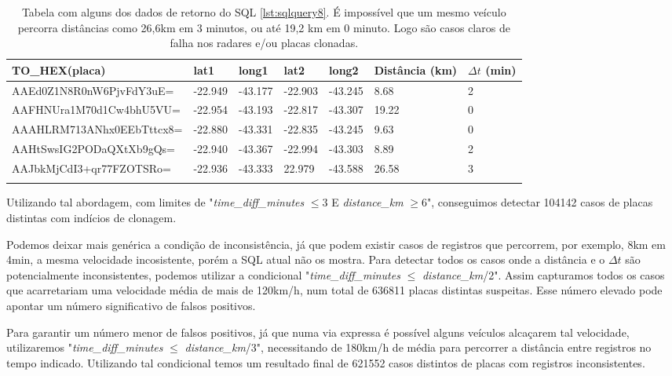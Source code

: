\documentclass{article}
\begin{document}
\begin{longtable}{|l|l|l|l|l|l|l|}
\hline
TO\_HEX(placa)  & lat1 & long1 & lat2 & long2 & Distância (km) & $\Delta t$ (min)  \\ \hline
AAEd0Z1N8R0nW6PjvFdY3uE= & -22.949    & -43.177    & -22.903 & -43.245 & 8.68  & 2         \\ \hline
AAFHNUra1M70d1Cw4bhU5VU= & -22.954 & -43.193   & -22.817 & -43.307    & 19.22 & 0    \\ \hline
AAAHLRM713ANhx0EEbTttcx8= & -22.880 & -43.331   & -22.835 & -43.245  & 9.63 & 0    \\ \hline
AAHtSwsIG2PODaQXtXb9gQs= & -22.940 & -43.367   & -22.994 & -43.303   & 8.89 & 2   \\ \hline
AAJbkMjCdI3+qr77FZOTSRo= & -22.936 & -43.333   & 22.979 & -43.588  & 26.58 & 3  \\ \hline
\caption{\label{tab:results1}  Tabela com alguns dos dados de retorno do SQL \ref{lst:sqlquery8}. É impossível que um mesmo veículo percorra distâncias como 26,6km em 3 minutos, ou até 19,2 km em 0 minuto. Logo são casos claros de falha nos radares e/ou placas clonadas.}
\end{longtable}

Utilizando tal abordagem, com limites de "\textit{time\_diff\_minutes} $\leq 3 $ E \textit{distance\_km} $ \geq 6$", conseguimos detectar 104142 casos de placas distintas com indícios de clonagem.

Podemos deixar mais genérica a condição de inconsistência, já que podem existir casos de registros que percorrem, por exemplo, 8km em 4min, a mesma velocidade incosistente, porém a SQL atual não os mostra. Para detectar todos os casos onde a distância e o $\Delta t$ são potencialmente inconsistentes, podemos utilizar a condicional "\textit{time\_diff\_minutes} $\leq$ \textit{distance\_km}/2". Assim capturamos todos os casos que acarretariam uma velocidade média de mais de 120km/h, num total de 636811 placas distintas suspeitas. Esse número elevado pode apontar um número significativo de falsos positivos.

Para garantir um número menor de falsos positivos, já que numa via expressa é possível alguns veículos alcaçarem tal velocidade, utilizaremos "\textit{time\_diff\_minutes} $\leq$ \textit{distance\_km}/3", necessitando de 180km/h de média para percorrer a distância entre registros no tempo indicado. Utilizando tal condicional temos um resultado final de 621552 casos distintos de placas com registros inconsistentes.
\end{document}
